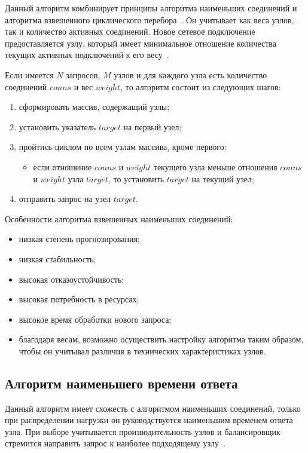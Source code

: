 Данный алгоритм комбинирует принципы алгоритма наименьших соединений и алгоритма взвешенного циклического перебора~\cite{part_algos}.
Он учитывает как веса узлов, так и количество активных соединений. 
Новое сетевое подключение предоставляется узлу, который имеет минимальное отношение количества текущих активных подключений к его весу~\cite{mainsource}.

Если имеется $N$ запросов, $M$ узлов и для каждого узла есть количество соединений $conns$ и вес $weight$, то алгоритм состоит из следующих шагов:
\begin{enumerate}
	\item сформировать массив, содержащий узлы;
	\item установить указатель $target$ на первый узел;
	\item пройтись циклом по всем узлам массива, кроме первого:
	\begin{itemize}
	\item если отношение $conns$ и $weight$ текущего узла меньше отношения $conns$ и $weight$ узла $target$, то установить $target$ на текущий узел; 
	\end{itemize}
	\item отправить запрос на узел $target$.
\end{enumerate}

Особенности алгоритма взвешенных наименьших соединений:
\begin{itemize}
	\item низкая степень прогнозирования; 
	\item низкая стабильность;
	\item высокая отказоустойчивость;
	\item высокая потребность в ресурсах;
	\item высокое время обработки нового запроса;
	\item благодаря весам, возможно осуществить настройку алгоритма таким образом, чтобы он учитывал различия в технических характеристиках узлов.
\end{itemize}


\subsection{Алгоритм наименьшего времени ответа}

Данный алгоритм имеет схожесть с алгоритмом наименьших соединений, только при распределении нагрузки он руководствуется наименьшим временем ответа узла.
При выборе учитывается производительность узлов и балансировщик стремится направить запрос к наиболее подходящему узлу~\cite{aws}.

